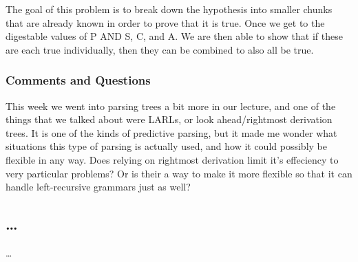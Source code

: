 \documentclass{article}
\theoremstyle{theorem}
\theoremstyle{definition}
\theoremstyle{remark}
\begin{document}
The goal of this problem is to break down the hypothesis into smaller chunks that are
already known in order to prove that it is true. Once we get to the digestable values
of P AND S, C, and A. We are then able to show that if these are each true individually,
then they can be combined to also all be true.

\subsubsection*{Comments and Questions}
This week we went into parsing trees a bit more in our lecture, and one of the 
things that we talked about were LARLs, or look ahead/rightmost derivation trees.
It is one of the kinds of predictive parsing, but it made me wonder what situations
this type of parsing is actually used, and how it could possibly be flexible in any way. 
Does relying on rightmost derivation limit it's effeciency to very particular problems?
Or is their a way to make it more flexible so that it can handle left-recursive 
grammars just as well?

\subsection{\ldots}

\ldots








\end{document}
